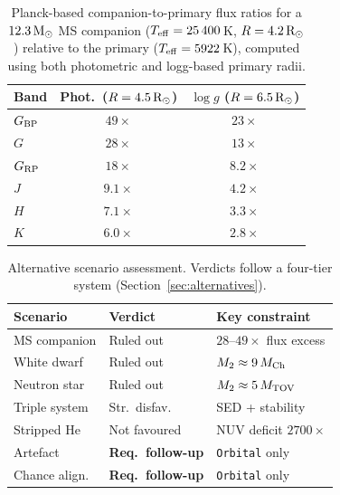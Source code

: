 \documentclass[usenatbib,fleqn]{mnras}
\newcommand{\Msun}{{\rm M}_\odot}
\newcommand{\Rsun}{{\rm R}_\odot}
\begin{document}
\begin{table}
\centering
\caption{Planck-based companion-to-primary flux ratios for a
$12.3\,\Msun$ MS companion ($T_{\rm eff} = 25\,400$\,K,
$R = 4.2\,\Rsun$) relative to the primary
($T_{\rm eff} = 5922$\,K), computed using both
photometric and logg-based primary radii.}
\label{tab:fluxratios}
\begin{tabular}{lcc}
\toprule
Band & Phot.\ ($R = 4.5\,\Rsun$) & $\log g$ ($R = 6.5\,\Rsun$) \\
\midrule
$G_{\rm BP}$     & $49\times$   & $23\times$ \\
$G$              & $28\times$   & $13\times$ \\
$G_{\rm RP}$     & $18\times$   & $8.2\times$ \\
$J$              & $9.1\times$  & $4.2\times$ \\
$H$              & $7.1\times$  & $3.3\times$ \\
$K$              & $6.0\times$  & $2.8\times$ \\
\bottomrule
\end{tabular}
\end{table}

\begin{table}
\centering
\caption{Alternative scenario assessment. Verdicts follow a
four-tier system (Section~\ref{sec:alternatives}).}
\label{tab:scenarios}
\begin{tabular}{lll}
\toprule
Scenario & Verdict & Key constraint \\
\midrule
MS companion    & Ruled out     & $28$--$49\times$ flux excess \\
White dwarf     & Ruled out     & $M_2 \approx 9\,M_{\rm Ch}$ \\
Neutron star    & Ruled out     & $M_2 \approx 5\,M_{\rm TOV}$ \\
Triple system   & Str.\ disfav.  & SED + stability \\
Stripped He     & Not favoured  & NUV deficit $2700\times$ \\
Artefact        & \textbf{Req.\ follow-up} & \texttt{Orbital} only \\
Chance align.   & \textbf{Req.\ follow-up} & \texttt{Orbital} only \\
\bottomrule
\end{tabular}
\end{table}
\end{document}
